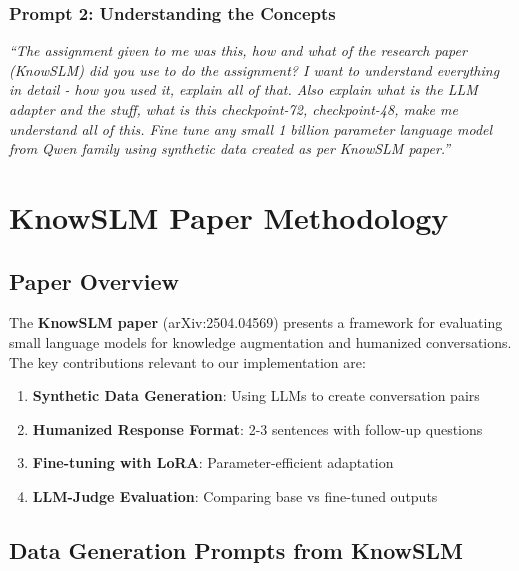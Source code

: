 \documentclass[12pt,a4paper]{article}
\begin{document}
\subsubsection{Prompt 2: Understanding the Concepts}

\begin{tcolorbox}[colback=gray!5!white,colframe=gray!75!black,title=Prompt 2]
\small
\textit{``The assignment given to me was this, how and what of the research paper (KnowSLM) did you use to do the assignment? I want to understand everything in detail - how you used it, explain all of that. Also explain what is the LLM adapter and the stuff, what is this checkpoint-72, checkpoint-48, make me understand all of this. Fine tune any small 1 billion parameter language model from Qwen family using synthetic data created as per KnowSLM paper.''}
\end{tcolorbox}

\section{KnowSLM Paper Methodology}

\subsection{Paper Overview}

The \textbf{KnowSLM paper} (arXiv:2504.04569) presents a framework for evaluating small language models for knowledge augmentation and humanized conversations. The key contributions relevant to our implementation are:

\begin{enumerate}
    \item \textbf{Synthetic Data Generation}: Using LLMs to create conversation pairs
    \item \textbf{Humanized Response Format}: 2-3 sentences with follow-up questions
    \item \textbf{Fine-tuning with LoRA}: Parameter-efficient adaptation
    \item \textbf{LLM-Judge Evaluation}: Comparing base vs fine-tuned outputs
\end{enumerate}

\subsection{Data Generation Prompts from KnowSLM}
\end{document}
